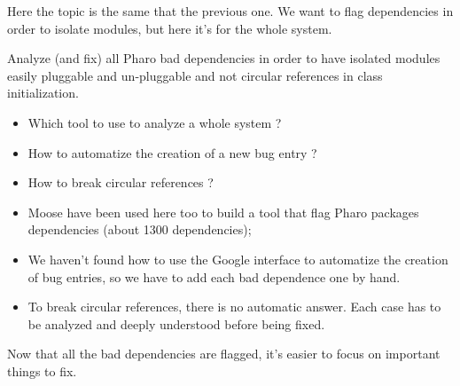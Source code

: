 Here the topic is the same that the previous one. We want to flag dependencies in order to isolate modules, but here it's for the whole system.

\goal Analyze (and fix) all \gls{Pharo} bad dependencies in order to have isolated modules easily pluggable and un-pluggable and not circular references in class initialization.

\problems 
\begin{itemize}
	\item Which tool to use to analyze a whole system ?
	\item How to automatize the creation of a new bug entry ?
	\item How to break circular references ?
\end{itemize}

\solutions 
\begin{itemize}
	\item Moose have been used here too to build a tool that flag Pharo packages dependencies (about 1300 dependencies);
	\item We haven't found how to use the Google interface to automatize the creation of bug entries, so we have to add each bad dependence one by hand.
	\item To break circular references, there is no automatic answer. Each case has to be analyzed and deeply understood before being fixed.
\end{itemize}

\inanutshell Now that all the bad dependencies are flagged, it's easier to focus on important things to fix.
